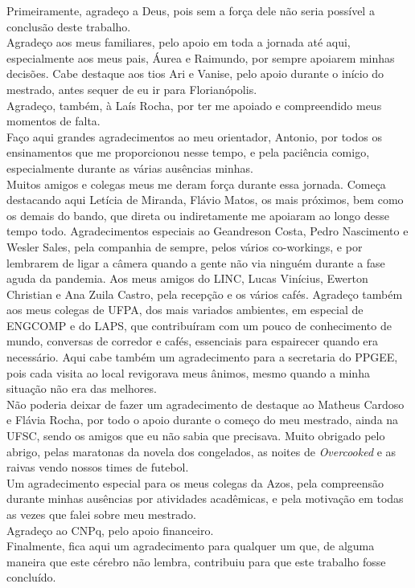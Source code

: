 \documentclass[
	12pt,				%
	openright,			%
	oneside,			%
	a4paper,			%
	chapter=TITLE,		%
	english,			%
	french,				%
	spanish,			%
	brazil				%
	]{abntex2}
\theoremstyle{definition}
\begin{document}
\begin{agradecimentos}
Primeiramente, agradeço a Deus, pois sem a força dele não seria possível a conclusão deste trabalho.\\
Agradeço aos meus familiares, pelo apoio em toda a jornada até aqui, especialmente aos meus pais, Áurea e Raimundo, por sempre apoiarem minhas decisões. Cabe destaque aos tios Ari e Vanise, pelo apoio durante o início do mestrado, antes sequer de eu ir para Florianópolis.\\
Agradeço, também, à Laís Rocha, por ter me apoiado e compreendido meus momentos de falta.\\
Faço aqui grandes agradecimentos ao meu orientador, Antonio, por todos os ensinamentos que me proporcionou nesse tempo, e pela paciência comigo, especialmente durante as várias ausências minhas.\\
Muitos amigos e colegas meus me deram força durante essa jornada. Começa destacando aqui Letícia de Miranda, Flávio Matos, os mais próximos, bem como os demais do bando, que direta ou indiretamente me apoiaram ao longo desse tempo todo. Agradecimentos especiais ao Geandreson Costa, Pedro Nascimento e Wesler Sales, pela companhia de sempre, pelos vários co-workings, e por lembrarem de ligar a câmera quando a gente não via ninguém durante a fase aguda da pandemia. Aos meus amigos do LINC, Lucas Vinícius, Ewerton Christian e Ana Zuila Castro, pela recepção e os vários cafés. Agradeço também aos meus colegas de UFPA, dos mais variados ambientes, em especial de ENGCOMP e do LAPS, que contribuíram com um pouco de conhecimento de mundo, conversas de corredor e cafés, essenciais para espairecer quando era necessário. Aqui cabe também um agradecimento para a secretaria do PPGEE, pois cada visita ao local revigorava meus ânimos, mesmo quando a minha situação não era das melhores.\\
Não poderia deixar de fazer um agradecimento de destaque ao Matheus Cardoso e Flávia Rocha, por todo o apoio durante o começo do meu mestrado, ainda na UFSC, sendo os amigos que eu não sabia que precisava. Muito obrigado pelo abrigo, pelas maratonas da novela dos congelados, as noites de \textit{Overcooked} e as raivas vendo nossos times de futebol.\\
Um agradecimento especial para os meus colegas da Azos, pela compreensão durante minhas ausências por atividades acadêmicas, e pela motivação em todas as vezes que falei sobre meu mestrado.\\
Agradeço ao CNPq, pelo apoio financeiro.\\
Finalmente, fica aqui um agradecimento para qualquer um que, de alguma maneira que este cérebro não lembra, contribuiu para que este trabalho fosse concluído.
\end{agradecimentos}
\end{document}
